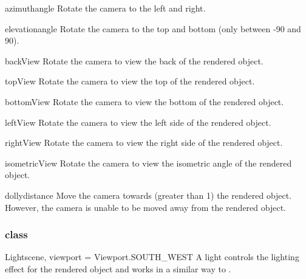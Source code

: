 \begin{methoddesc}[Camera]{azimuth}{angle}
Rotate the camera to the left and right.
\end{methoddesc}

\begin{methoddesc}[Camera]{elevation}{angle}
Rotate the camera to the top and bottom (only between -90 and 90).
\end{methoddesc}

\begin{methoddesc}[Camera]{backView}{}
Rotate the camera to view the back of the rendered object.
\end{methoddesc}

\begin{methoddesc}[Camera]{topView}{}
Rotate the camera to view the top of the rendered object.
\end{methoddesc}

\begin{methoddesc}[Camera]{bottomView}{}
Rotate the camera to view the bottom of the rendered object.
\end{methoddesc}

\begin{methoddesc}[Camera]{leftView}{}
Rotate the camera to view the left side of the rendered object.
\end{methoddesc}

\begin{methoddesc}[Camera]{rightView}{}
Rotate the camera to view the right side of the rendered object.
\end{methoddesc}

\begin{methoddesc}[Camera]{isometricView}{}
Rotate the camera to view the isometric angle of the rendered object.
\end{methoddesc}

\begin{methoddesc}[Camera]{dolly}{distance}
Move the camera towards (greater than 1) the rendered object. However,
the camera is unable to be moved away from the rendered object.
\end{methoddesc}

\subsubsection{\Light class}

\begin{classdesc}{Light}{scene, viewport = Viewport.SOUTH_WEST}
A light controls the lighting effect for the rendered object and works in 
a similar way to \Camera.
\end{classdesc}

